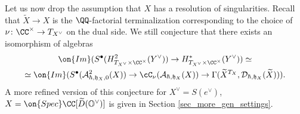 \documentclass[12pt]{amsart}
\begin{document}
\begin{rmk}\label{rem_general_conj}
Let us now drop the assumption that $X$ has a resolution of singularities. Recall that $\widetilde{X} \rightarrow X$ is the $\QQ$-factorial terminalization corresponding to the choice of $\nu\colon \CC^\times \rightarrow T_{X^\vee}$ on the dual side. We still conjecture that there exists an isomorphism of algebras 
\begin{multline*}
\on{Im}(S^\bullet(H^2_{T_{X^\vee} \times \CC^\times}(Y^\vee)) \rightarrow H^*_{T_{X^\vee} \times \CC^\times}(Y^\vee)) \simeq \\
 \simeq \on{Im}(S^\bullet(\mathcal{A}^2_{\hbar,\mathfrak{h}_X,0}(X)) \rightarrow \cC_\nu(\mathcal{A}_{\hbar,\mathfrak{h}_X}(X)) \rightarrow \Gamma(\widetilde{X}^{T_{X}},\mathcal{D}_{\hbar,\mathfrak{h}_X}(\widetilde{X}))).
\end{multline*}
A more refined version of this conjecture for $X^\vee=S(e^\vee)$, $X=\on{Spec}\CC[\widetilde{D}(\mathbb{O}^\vee)]$ is given in Section \ref{sec_more_gen_settings}.
\end{rmk}

\end{document}
